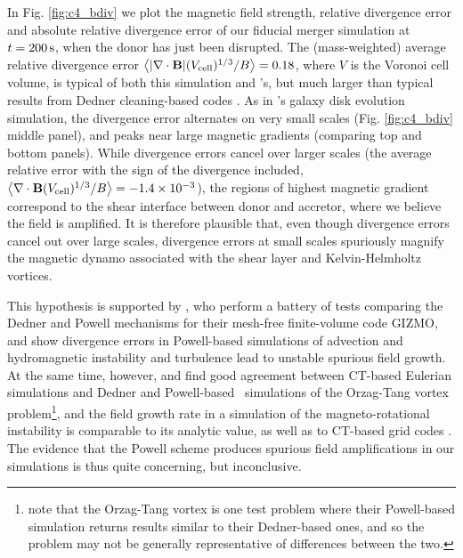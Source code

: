 In Fig. \ref{fig:c4_bdiv} we plot the magnetic field strength, relative divergence error and absolute relative divergence error of our fiducial merger simulation at $t = 200\,\mathrm{s}$, when the donor has just been disrupted.  The (mass-weighted) average relative divergence error $\left\langle|\mathbf{\nabla\cdot B}|(V_\mathrm{cell})^{1/3}/B\right\rangle = 0.18$, where $V$ is the Voronoi cell volume, is typical of both this simulation and \citep{pakms13}'s, but much larger than typical results from Dedner cleaning-based codes \citep{tric15, hopkr16}.  As in \cite{pakms13}'s galaxy disk evolution simulation, the divergence error alternates on very small scales (Fig. \ref{fig:c4_bdiv} middle panel), and peaks near large magnetic gradients (comparing top and bottom panels).  While divergence errors cancel over larger scales (the average relative error with the sign of the divergence included, $\left\langle\mathbf{\nabla\cdot B}(V_\mathrm{cell})^{1/3}/B\right\rangle = -1.4\times10^{-3}$), the regions of highest magnetic gradient correspond to the shear interface between donor and accretor, where we believe the field is amplified.  It is therefore plausible that, even though divergence errors cancel out over large scales, divergence errors at small scales spuriously magnify the magnetic dynamo associated with the shear layer and Kelvin-Helmholtz vortices.  

This hypothesis is supported by \cite{hopkr16}, who perform a battery of tests comparing the Dedner and Powell mechanisms for their mesh-free finite-volume code \textsc{GIZMO}, and show divergence errors in Powell-based simulations of advection and hydromagnetic instability and turbulence lead to unstable spurious field growth.  At the same time, however, \cite{pakmbs11} and \cite{pakms13} find good agreement between CT-based Eulerian simulations and Dedner and Powell-based \arepo\ simulations of the Orzag-Tang vortex problem\footnote{\cite{hopkr16} note that the Orzag-Tang vortex is one test problem where their Powell-based simulation returns results similar to their Dedner-based ones, and so the problem may not be generally representative of differences between the two.}, and the field growth rate in a simulation of the magneto-rotational instability is comparable to its analytic value, as well as to CT-based grid codes \citep{floc+10}.  The evidence that the Powell scheme produces spurious field amplifications in our simulations is thus quite concerning, but inconclusive.


